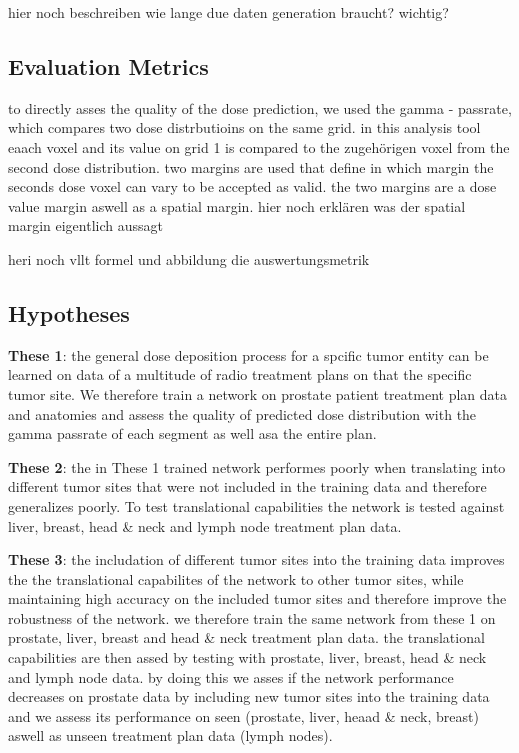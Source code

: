 hier noch beschreiben wie lange due daten generation braucht? wichtig? 

\subsection{Evaluation Metrics}

to directly asses the quality of the dose prediction, we used the gamma - passrate, which compares two dose distrbutioins on the same grid. in this analysis tool eaach voxel and its value on grid 1 is compared to the zugehörigen voxel from the second dose distribution. two margins are used that define in which margin the seconds dose voxel can vary to be accepted as valid. the two margins are a dose value margin aswell as a spatial margin. hier noch erklären was der spatial margin eigentlich aussagt

heri noch vllt formel und abbildung die auswertungsmetrik

\subsection{Hypotheses}

\begin{hangingpar}
    \item\textbf{These 1}: the general dose deposition process for a spcific tumor entity can be learned on data of a multitude of radio treatment plans on that the specific tumor site. We therefore train a network on prostate patient treatment plan data and anatomies and assess the quality of predicted dose distribution with the gamma passrate of each segment as well asa the entire plan. 
\end{hangingpar}

\begin{hangingpar}
    \item\textbf{These 2}: the in These 1 trained network performes poorly when translating into different tumor sites that were not included in the training data and therefore generalizes poorly. To test translational capabilities the network is tested against liver, breast, head \& neck and lymph node treatment plan data.
\end{hangingpar}

\begin{hangingpar}
    \item\textbf{These 3}: the includation of different tumor sites into the training data improves the the translational capabilites of the network to other tumor sites, while maintaining high accuracy on the included tumor sites and therefore improve the robustness of the network. we therefore train the same network from these 1 on prostate, liver, breast and head \& neck treatment plan data. the translational capabilities are then assed by testing with prostate, liver, breast, head \& neck and lymph node data. by doing this we asses if the network performance decreases on prostate data by including new tumor sites into the training data and we assess its performance on seen (prostate, liver, heaad \& neck, breast) aswell as unseen treatment plan data (lymph nodes).
\end{hangingpar}

